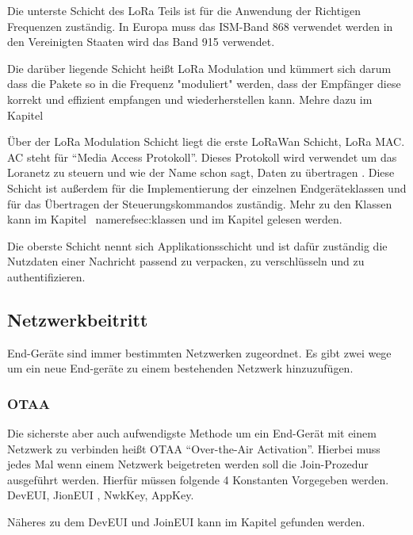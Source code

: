 \documentclass[a4paper,12pt]{article}
\begin{document}
            Die unterste Schicht des LoRa Teils ist für die Anwendung der Richtigen Frequenzen zuständig. In Europa 
            muss das ISM-Band 868 verwendet werden in den Vereinigten Staaten wird das Band 915 
            verwendet.\cite[S.7]{WhatIsLoRa}

            Die darüber liegende Schicht heißt LoRa Modulation und kümmert sich darum dass die Pakete so in die 
            Frequenz "moduliert" werden, dass der Empfänger diese korrekt und effizient empfangen und wiederherstellen 
            kann. Mehre dazu im Kapitel 

            Über der LoRa Modulation Schicht liegt die erste LoRaWan Schicht, LoRa MAC. AC steht für ``Media Access 
            Protokoll''. Dieses Protokoll wird verwendet um das Loranetz zu steuern und wie der Name schon sagt, 
            Daten zu übertragen . Diese Schicht ist außerdem für die Implementierung der einzelnen Endgeräteklassen 
            und für das Übertragen der Steuerungskommandos zuständig. Mehr zu den Klassen kann im Kapitel \
            nameref{sec:klassen} und im Kapitel  gelesen werden.

            Die oberste Schicht nennt sich Applikationsschicht und ist dafür zuständig die Nutzdaten einer Nachricht 
            passend zu verpacken, zu verschlüsseln und zu authentifizieren.
        \subsection{Netzwerkbeitritt}
            End-Geräte sind immer bestimmten Netzwerken zugeordnet. Es gibt zwei wege um ein neue End-geräte zu einem 
            bestehenden Netzwerk hinzuzufügen.
            \subsubsection{OTAA} \label{sec:OTAA}
                Die sicherste aber auch aufwendigste Methode um ein End-Gerät mit einem Netzwerk zu verbinden heißt 
                OTAA ``Over-the-Air Activation''. Hierbei muss jedes Mal wenn einem Netzwerk beigetreten werden soll 
                die Join-Prozedur ausgeführt werden. Hierfür müssen folgende 4 Konstanten Vorgegeben werden. DevEUI, 
                JionEUI , NwkKey, AppKey. \marginpar{erklären der schlüssel?}

                Näheres zu dem DevEUI und JoinEUI kann im Kapitel  gefunden werden.
\end{document}
